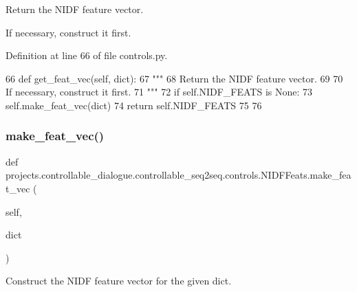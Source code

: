 \begin{DoxyVerb}Return the NIDF feature vector.

If necessary, construct it first.
\end{DoxyVerb}
 

Definition at line 66 of file controls.\+py.


\begin{DoxyCode}
66     \textcolor{keyword}{def }get\_feat\_vec(self, dict):
67         \textcolor{stringliteral}{"""}
68 \textcolor{stringliteral}{        Return the NIDF feature vector.}
69 \textcolor{stringliteral}{}
70 \textcolor{stringliteral}{        If necessary, construct it first.}
71 \textcolor{stringliteral}{        """}
72         \textcolor{keywordflow}{if} self.NIDF\_FEATS \textcolor{keywordflow}{is} \textcolor{keywordtype}{None}:
73             self.make\_feat\_vec(dict)
74         \textcolor{keywordflow}{return} self.NIDF\_FEATS
75 
76 
\end{DoxyCode}
\mbox{\label{classprojects_1_1controllable__dialogue_1_1controllable__seq2seq_1_1controls_1_1NIDFFeats_aa47a19d4008d0431359caa6d813f34bc}} 
\subsubsection{\texorpdfstring{make\+\_\+feat\+\_\+vec()}{make\_feat\_vec()}}
{\footnotesize\ttfamily def projects.\+controllable\+\_\+dialogue.\+controllable\+\_\+seq2seq.\+controls.\+N\+I\+D\+F\+Feats.\+make\+\_\+feat\+\_\+vec (\begin{DoxyParamCaption}\item[{}]{self,  }\item[{}]{dict }\end{DoxyParamCaption})}

\begin{DoxyVerb}Construct the NIDF feature vector for the given dict.
\end{DoxyVerb}
 

